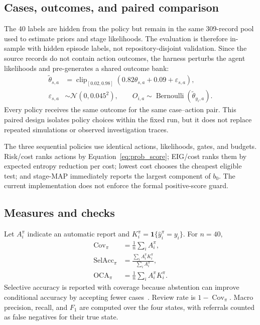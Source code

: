 \documentclass{article}
\begin{document}
\subsection{Cases, outcomes, and paired comparison}

The 40 labels are hidden from the policy but remain in the same 309-record pool
used to estimate priors and stage likelihoods. The evaluation is therefore
in-sample with hidden episode labels, not repository-disjoint validation. Since
the source records do not contain action outcomes, the harness perturbs the
agent likelihoods and pre-generates a shared outcome bank:
\begin{align}
\widetilde\theta_{s,a}
  &=\operatorname{clip}_{[0.02,0.98]}
    \!\left(0.82\theta_{s,a}+0.09+\varepsilon_{s,a}\right),
  \label{eq:simulator_probability}\\
\varepsilon_{s,a}
  &\sim\mathcal N(0,0.045^2),\qquad
O_{i,a}\sim\operatorname{Bernoulli}
  (\widetilde\theta_{y_i,a}).
  \label{eq:simulator_outcome}
\end{align}
Every policy receives the same outcome for the same case--action pair. This
paired design isolates policy choices within the fixed run, but it does not
replace repeated simulations or observed investigation traces.

The three sequential policies use identical actions, likelihoods, gates, and
budgets. Risk/cost ranks actions by Equation~\eqref{eq:prob_score};
EIG/cost ranks them by expected entropy reduction per cost; lowest cost chooses
the cheapest eligible test; and stage-MAP immediately reports the largest
component of $b_0$. The current implementation does not enforce the formal
positive-score guard.

\subsection{Measures and checks}

Let $A_i^\pi$ indicate an automatic report and
$K_i^\pi=\mathbf1\{\widehat y_i^\pi=y_i\}$. For $n=40$,
\begin{align}
\operatorname{Cov}_\pi
  &=\frac{1}{n}\sum_i A_i^\pi,
  \label{eq:coverage}\\
\operatorname{SelAcc}_\pi
  &=\frac{\sum_i A_i^\pi K_i^\pi}{\sum_i A_i^\pi},
  \label{eq:selective_accuracy}\\
\operatorname{OCA}_\pi
  &=\frac{1}{n}\sum_i A_i^\pi K_i^\pi.
  \label{eq:overall_correct_auto}
\end{align}
Selective accuracy is reported with coverage because abstention can improve
conditional accuracy by accepting fewer cases~\cite{Geifman2017Selective}.
Review rate is $1-\operatorname{Cov}_\pi$. Macro precision, recall, and $F_1$
are computed over the four states, with referrals counted as false negatives
for their true state.
\end{document}
